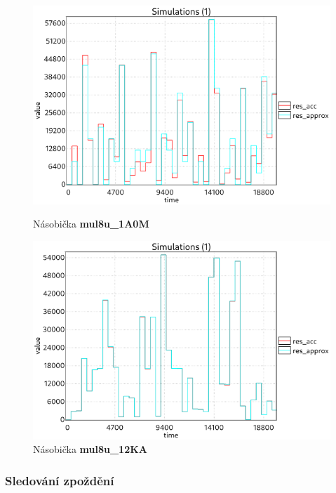 \begin{figure}[H]
\centering
\begin{minipage}{.5\textwidth}
  \centering
  \includegraphics[width=0.95\linewidth]{obrazky-figures/results_1A0M.png}
  \caption{Násobička \textbf{mul8u\_1A0M}}
  \label{fig:results_1A0M}
\end{minipage}%
\begin{minipage}{.5\textwidth}
  \centering
  \includegraphics[width=0.95\linewidth]{obrazky-figures/results_12KA.png}
  \caption{Násobička \textbf{mul8u\_12KA}}
  \label{fig:results_12KA}
\end{minipage}
\end{figure}

\bigskip
\bigskip
\bigskip

\subsubsection{Sledování zpoždění}

